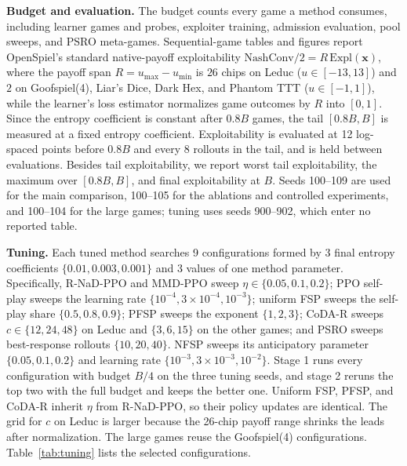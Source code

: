 \documentclass{article}
\theoremstyle{plain}
\theoremstyle{remark}
\newcommand{\Expl}{\mathrm{Expl}}
\newcommand{\bx}{{\bm{x}}}
\newcommand{\codar}{CoDA-R}
\newcommand{\rnad}{R-NaD-PPO}
\begin{document}
\textbf{Budget and evaluation.} The budget counts every game a method consumes, including learner games and probes, exploiter training, admission evaluation, pool sweeps, and PSRO meta-games. Sequential-game tables and figures report OpenSpiel's standard native-payoff exploitability $\mathrm{NashConv}/2=R\,\Expl(\bx)$, where the payoff span $R=u_{\max}-u_{\min}$ is $26$ chips on Leduc ($u\in[-13,13]$) and $2$ on Goofspiel(4), Liar's Dice, Dark Hex, and Phantom TTT ($u\in[-1,1]$), while the learner's loss estimator normalizes game outcomes by $R$ into $[0,1]$. Since the entropy coefficient is constant after $0.8B$ games, the tail $[0.8B,B]$ is measured at a fixed entropy coefficient. Exploitability is evaluated at 12 log-spaced points before $0.8B$ and every 8 rollouts in the tail, and is held between evaluations. Besides tail exploitability, we report worst tail exploitability, the maximum over $[0.8B,B]$, and final exploitability at $B$. Seeds 100--109 are used for the main comparison, 100--105 for the ablations and controlled experiments, and 100--104 for the large games; tuning uses seeds 900--902, which enter no reported table.

\textbf{Tuning.} Each tuned method searches 9 configurations formed by 3 final entropy coefficients $\{0.01,0.003,0.001\}$ and 3 values of one method parameter. Specifically, \rnad{} and MMD-PPO sweep $\eta\in\{0.05,0.1,0.2\}$; PPO self-play sweeps the learning rate $\{10^{-4},3\times10^{-4},10^{-3}\}$; uniform FSP sweeps the self-play share $\{0.5,0.8,0.9\}$; PFSP sweeps the exponent $\{1,2,3\}$; \codar{} sweeps $c\in\{12,24,48\}$ on Leduc and $\{3,6,15\}$ on the other games; and PSRO sweeps best-response rollouts $\{10,20,40\}$. NFSP sweeps its anticipatory parameter $\{0.05,0.1,0.2\}$ and learning rate $\{10^{-3},3\times10^{-3},10^{-2}\}$. Stage 1 runs every configuration with budget $B/4$ on the three tuning seeds, and stage 2 reruns the top two with the full budget and keeps the better one. Uniform FSP, PFSP, and \codar{} inherit $\eta$ from \rnad{}, so their policy updates are identical. The grid for $c$ on Leduc is larger because the 26-chip payoff range shrinks the leads after normalization. The large games reuse the Goofspiel(4) configurations. Table~\ref{tab:tuning} lists the selected configurations.
\end{document}
